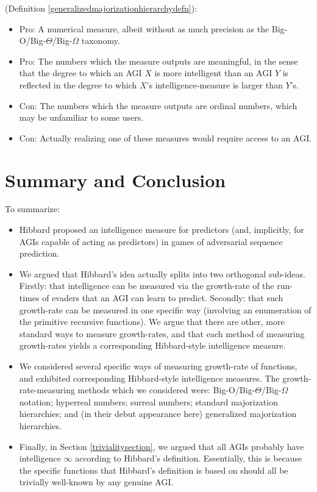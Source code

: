 \documentclass{article}
\begin{document}
\begin{itemize}
    (Definition \ref{generalizedmajorizationhierarchydefn}):
    \begin{itemize}
        \item
        Pro: A numerical measure, albeit without as much precision as the
        Big-O/Big-$\Theta$/Big-$\Omega$ taxonomy.
        \item
        Pro: The numbers which the measure outputs are meaningful, in the sense that
        the degree to which an AGI $X$ is more intelligent than an AGI $Y$ is reflected
        in the degree to which $X$'s intelligence-measure is larger than $Y$'s.
        \item
        Con: The numbers which the measure outputs are ordinal numbers, which may be
        unfamiliar to some users.
        \item
        Con: Actually realizing one of these measures would require access to an AGI.
    \end{itemize}
\end{itemize}

\section{Summary and Conclusion}
\label{conclusionsection}

To summarize:
\begin{itemize}
    \item
    Hibbard proposed \cite{hibbard} an intelligence measure for predictors (and, implicitly,
    for AGIs capable of acting as predictors) in games of adversarial sequence prediction.
    \item
    We argued that Hibbard's idea actually splits into two orthogonal sub-ideas.
    Firstly: that intelligence can be measured via the growth-rate of the run-times
    of evaders that an AGI can learn to predict. Secondly: that such growth-rate can
    be measured in one specific way (involving an enumeration of the primitive recursive
    functions). We argue that there are other, more standard ways to measure growth-rates,
    and that each method of measuring growth-rates yields a corresponding Hibbard-style
    intelligence measure.
    \item
    We considered several specific ways of measuring growth-rate of functions, and exhibited
    corresponding Hibbard-style intelligence measures. The growth-rate-measuring methods
    which we considered were: Big-O/Big-$\Theta$/Big-$\Omega$ notation; hyperreal numbers;
    surreal numbers; standard majorization hierarchies; and (in their debut appearance here)
    generalized majorization hierarchies.
    \item
    Finally, in Section \ref{trivialitysection}, we argued that all AGIs probably have
    intelligence $\infty$ according to Hibbard's definition. Essentially, this is because
    the specific functions that Hibbard's definition is based on should all be trivially
    well-known by any genuine AGI.
\end{itemize}
\end{document}
